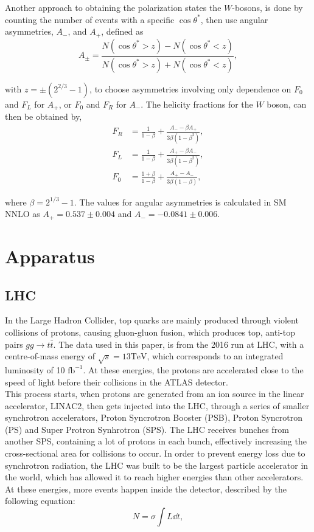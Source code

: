 \documentclass[12pt,a4paper]{article}
\begin{document}
Another approach to obtaining the polarization states the $W$-bosons, is done by
counting the number of events with a specific $\cos \theta^*$, then use angular
asymmetries, $A_-$, and $A_+$, defined as
\begin{equation}
  A_{\pm}=\frac{N(\cos \theta^* > z)-N(\cos \theta^* < z)}{N(\cos \theta^* > z)+N(\cos \theta^* < z)},
\end{equation}

with $z=\pm(2^{2/3}-1)$, to choose asymmetries involving only dependence on
$F_0$ and $F_L$ for $A_+$, or $F_0$ and $F_R$ for $A_-$. The helicity fractions
for the $W$ boson, can then be obtained by,
\begin{align}
  F_R&=\frac{1}{1-\beta}+\frac{A_- - \beta A_+}{3\beta (1-\beta^2)},\\
  F_L&=\frac{1}{1-\beta}+\frac{A_+ - \beta A_-}{3\beta (1-\beta^2)},\\
  F_0&=\frac{1+\beta}{1-\beta}+\frac{A_+ - A_-}{3\beta (1-\beta)},
\end{align}

where $\beta = 2^{1/3}-1$. The values for angular asymmetries is calculated in SM
NNLO as $A_+=0.537 \pm 0.004$ and $A_-=-0.0841 \pm 0.006$.

\section{Apparatus}

\subsection{LHC}
In the Large Hadron Collider, top quarks are mainly produced through violent
collisions of protons, causing gluon-gluon fusion, which produces top, anti-top
pairs $gg \rightarrow t\bar t$. The data used in this paper, is from the 2016 run at LHC,
with a centre-of-mass energy of $\sqrt s = 13 \mathrm{TeV}$, which corresponds
to an integrated luminosity of 10 $\mathrm{fb}^{-1}$\cite{oreach2020}. At these
energies, the protons are accelerated close to the speed of light before their
collisions in the ATLAS detector.\\

This process starts, when protons are generated from an ion source in the linear
accelerator, LINAC2, then gets injected into the LHC, through a series of
smaller synchrotron accelerators, Proton Syncrotron Booster (PSB), Proton
Syncrotron (PS) and Super Protron Synhrotron (SPS)\cite[135]{Evans_2008}. The
LHC receives bunches from another SPS, containing a lot of protons in each
bunch, effectively increasing the cross-sectional area for collisions to occur.
In order to prevent energy loss due to synchrotron radiation, the LHC was built
to be the largest particle accelerator in the world, which has allowed it to
reach higher energies than other accelerators. At these energies, more events
happen inside the detector, described by the following equation:
\begin{equation}
  N = \sigma \int L \dd t,
\end{equation}
\end{document}
